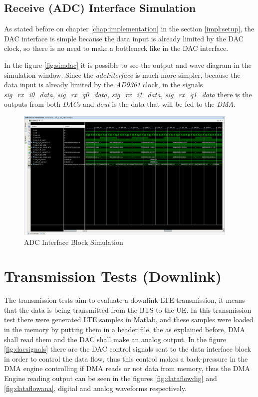 \subsection{Receive (ADC) Interface Simulation}

As stated before on chapter \ref{chap:implementation} in the section \ref{impl:setup},
the DAC interface is simple because the data input is already limited by the DAC
clock, so there is no need to make a bottleneck like in the DAC interface.

 In the figure \ref{fig:simdac} it is possible to see the output and wave
diagram in the simulation window. Since the \textit{adcInterface} is much more
simpler, because the data input is already limited by the \textit{AD9361}
clock, in the signals \textit{sig\_rx\_i0\_data, sig\_rx\_q0\_data,
sig\_rx\_i1\_data, sig\_rx\_q1\_data} there is the outputs from both
\textit{DACs} and \textit{dout} is the data that will be fed to the
\textit{DMA}.\\

\begin{figure}[htbp]
    \centering
    \includegraphics[width=0.95\textwidth,
    trim={{.13\textwidth} {.95\textwidth} {.05\textwidth} {.15\textwidth}},
    clip]{./figures/adcInterface}
    \caption{ ADC Interface Block Simulation
    \label{fig:simadc}}
\end{figure}



\section{Transmission Tests (Downlink)}
\label{result:dac}

 The transmission tests aim to evaluate a downlink LTE transmission, it means
that the data is being transmitted from the BTS to the UE. In this transmission
test there were generated LTE samples in Matlab, and these samples were loaded
in the memory by putting them in a header file, the as explained before, DMA
shall read them and the DAC shall make an analog output. In the figure
\ref{fig:dacsignals} there are the DAC control signals sent to the data
interface block in order to control the data flow, thus this control makes a
back-pressure in the DMA engine controlling if DMA reads or not data from
memory, thus the DMA Engine reading output can be seen in the figures
\ref{fig:dataflowdig} and \ref{fig:dataflowana}, digital and analog waveforms
respectively.\\

